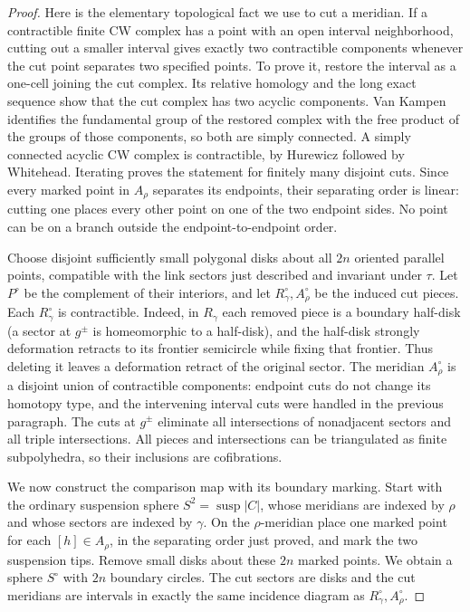 \begin{proof}
Here is the elementary topological fact we use to cut a meridian. If a
contractible finite CW complex has a point with an open interval
neighborhood, cutting out a smaller interval gives exactly two contractible
components whenever the cut point separates two specified points. To prove
it, restore the interval as a one-cell joining the cut complex. Its relative
homology and the long exact sequence show that the cut complex has two
acyclic components. Van Kampen identifies the fundamental group of the
restored complex with the free product of the groups of those components,
so both are simply connected. A simply connected acyclic CW complex is
contractible, by Hurewicz followed by Whitehead. Iterating proves the
statement for finitely many disjoint cuts. Since every marked point in
$A_\rho$ separates its endpoints, their separating order is linear: cutting
one places every other point on one of the two endpoint sides. No point
can be on a branch outside the endpoint-to-endpoint order.

Choose disjoint sufficiently small polygonal disks about all $2n$ oriented
parallel points, compatible with the link sectors just described and
invariant under $\tau$. Let $P^\circ$ be the complement of their interiors,
and let $R_\gamma^\circ,A_\rho^\circ$ be the induced cut pieces. Each
$R_\gamma^\circ$ is contractible. Indeed, in $R_\gamma$ each removed piece
is a boundary half-disk (a sector at $g^\pm$ is homeomorphic to a half-disk),
and the half-disk strongly deformation retracts to its frontier semicircle
while fixing that frontier. Thus deleting it leaves a deformation retract
of the original sector. The meridian $A_\rho^\circ$ is a disjoint union of
contractible components: endpoint cuts do not change its homotopy type,
and the intervening interval cuts were handled in the previous paragraph.
The cuts at $g^\pm$ eliminate all intersections of nonadjacent sectors and
all triple intersections. All pieces and intersections can be triangulated
as finite subpolyhedra, so their inclusions are cofibrations.

We now construct the comparison map with its boundary marking. Start with
the ordinary suspension sphere $S^2=\operatorname{susp}|C|$, whose meridians
are indexed by $\rho$ and whose sectors are indexed by $\gamma$. On the
$\rho$-meridian place one marked point for each $[h]\in A_\rho$, in the
separating order just proved, and mark the two suspension tips. Remove small
disks about these $2n$ marked points. We obtain a sphere $S^\circ$ with
$2n$ boundary circles. The cut sectors are disks and the cut meridians are
intervals in exactly the same incidence diagram as
$R_\gamma^\circ,A_\rho^\circ$.


\end{proof}
